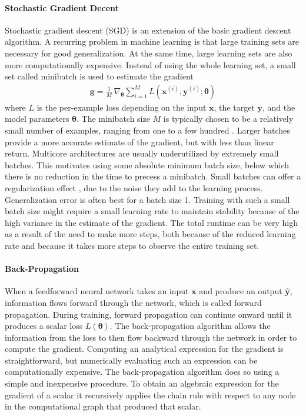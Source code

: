\documentclass{scrartcl}
\begin{document}
\paragraph{Stochastic Gradient Decent}
Stochastic gradient descent (SGD) is an extension of the basic gradient descent algorithm. A recurring problem in machine learning is that large training sets are necessary for good generalization. At the same time, large learning sets are also more computationally expensive. Instead of using the whole learning set, a small set called minibatch is used to estimate the gradient
\begin{align}
\mathbf g = \frac{1}{M} \,\nabla_{\boldsymbol \theta} \sum_{i=1}^M L(\mathbf x^{(i)}, \mathbf y^{(i)}; \boldsymbol \theta)
\end{align}  
where $L$ is the per-example loss depending on the input $\mathbf x$, the target $\mathbf y$, and the model parameters $\boldsymbol \theta$. The minibatch size $M$ is typically chosen to be a relatively small number of examples, ranging from one to a few hundred \cite{Goodfellow2016}. Larger batches provide a more accurate estimate of the gradient, but with less than linear return. Multicore architectures are usually underutilized by extremely small batches. This motivates using some absolute minimum batch size, below which there is no reduction in the time to precess a minibatch. Small batches can offer a regularization effect \cite{Wilson2003}, due to the noise they add to the learning process. Generalization error is often best for a batch size 1. Training with such a small batch size might require a small learning rate to maintain stability because of the high variance in the estimate of the gradient. The total runtime can be very high as a result of the need to make more steps, both because of the reduced learning rate and because it takes more steps to observe the entire training set. 

\paragraph{Back-Propagation}
When a feedforward neural network takes an input $\mathbf x$ and produce an output $\hat{\mathbf y}$, information flows forward through the network, which is called forward propagation. During training, forward propagation can continue onward until it produces a scalar loss $L(\boldsymbol \theta)$. The back-propagation algorithm \cite{Rumelhart1988} allows the information from the loss to then flow backward through the network in order to compute the gradient. Computing an analytical expression for the gradient is straightforward, but numerically evaluating such an expression can be computationally expensive. The back-propagation algorithm does so using a simple and inexpensive procedure. To obtain an algebraic expression for the gradient of a scalar it recursively applies the chain rule with respect to any node in the computational graph that produced that scalar. 
\end{document}
